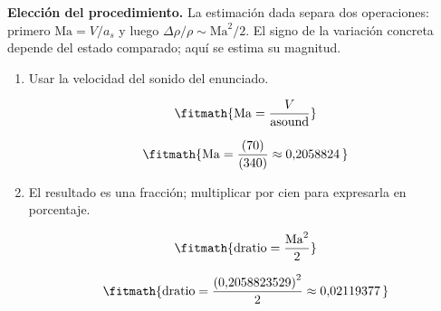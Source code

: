 \noindent\textbf{Elección del procedimiento.} La estimación dada separa dos operaciones: primero $\mathrm{Ma}=V/a_s$ y luego $\Delta\rho/\rho\sim\mathrm{Ma}^2/2$. El signo de la variación concreta depende del estado comparado; aquí se estima su magnitud.

\begin{enumerate}

\item Usar la velocidad del sonido del enunciado.

\[\fitmath{\mathrm{Ma}=\frac{V}{\mathrm{asound}}}\]

\[\fitmath{\mathrm{Ma}=\frac{(70)}{(340)}\approx 0{,}2058824\,}\]

\item El resultado es una fracción; multiplicar por cien para expresarla en porcentaje.

\[\fitmath{\mathrm{dratio}=\frac{{\mathrm{Ma}}^{2}}{2}}\]

\[\fitmath{\mathrm{dratio}=\frac{{(0{,}2058823529)}^{2}}{2}\approx 0{,}02119377\,}\]

\end{enumerate}
